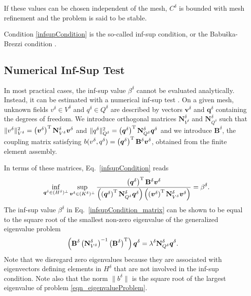 \documentclass[journal]{IEEEtran}
\renewcommand{\vec}[1]{\boldsymbol{#1}} %
\newcommand{\mat}[1]{\mathbf{#1}} %
\newcommand{\paren}[1]{\left(#1\right)}
\newcommand{\transpose}{^{\text T}}
\begin{document}
If these values can be chosen independent of the mesh, $C^\delta$ is bounded with mesh refinement and the problem is said to be stable.

Condition \eqref{infsupCondition} is the so-called inf-sup condition, or the Babu{\v{s}}ka-Brezzi condition \cite{babuvska1973finite,brezzi1974existence}.



\subsection{Numerical Inf-Sup Test}

In most practical cases, the inf-sup value $\beta^\delta$ cannot be evaluated analytically. Instead, it can be estimated with a numerical inf-sup test \cite{brezziBook,chapelle1993inf}. On a given mesh, unknown fields $v^\delta \in V^\delta$ and $q^\delta \in Q^\delta$ are described by vectors $\vec v^{\delta}$ and $\vec q^{\delta}$ containing the degrees of freedom. We introduce orthogonal matrices $\mat N^{\delta}_{V^\delta}$ and $\mat N^{\delta}_{Q^\delta}$ such that $\|v^{\delta}\|_{V^{\delta}}^2 = \paren{\vec v^{\delta}}\transpose \mat N^{\delta}_{V^\delta} \vec v^{\delta}$ and $\|q^{\delta}\|_{Q^{\delta}}^2 = \paren{\vec q^{\delta}}\transpose \mat N^{\delta}_{Q^{\delta}}\vec q^{\delta}$ and we introduce $\mat B^{\delta}$, the coupling matrix satisfying $b(v^{\delta},q^{\delta}) = \paren{\vec q^{\delta}}\transpose \mat B^{\delta} \vec v^{\delta}$, obtained from the finite element assembly.

In terms of these matrices, Eq.~\eqref{infsupCondition} reads
\begin{align}\label{infsupCondition_matrix}
\inf_{\vec q^{\delta}\in (H^\delta)^\perp} \sup_{\vec v^{\delta}\in (K^\delta)^\perp} \frac{\paren{\vec q^{\delta}}\transpose \mat B^{\delta} \vec v^{\delta}}{ \paren{\paren{\vec q^{\delta}}\transpose \mat N^{\delta}_{Q^{\delta}}\vec q^{\delta}} \paren{\paren{\vec v^{\delta}}\transpose \mat N^{\delta}_{V^\delta} \vec v^{\delta}}} = \beta^\delta.
\end{align}
The inf-sup value $\beta^{\delta}$ in Eq.~\eqref{infsupCondition_matrix} can be shown to be equal to the square root of the smallest non-zero eigenvalue of the generalized eigenvalue problem \cite{malkus1981eigenproblems}
\begin{align}\label{eqn_eigenvalueProblem}
\paren{\mat B^{\delta} \paren{\mat N^{\delta}_{V^{\delta}}}^{-1} \paren{\mat B^{\delta}}\transpose} \vec q^{\delta} &= \lambda^{\delta} \mat N^{\delta}_{Q^{\delta}} \vec q^{\delta}.
\end{align}
Note that we disregard zero eigenvalues because they are associated with eigenvectors defining elements in $H^\delta$ that are not involved in the inf-sup condition. Note also that the norm $\|b^\delta\|$ is the square root of the largest eigenvalue of problem \eqref{eqn_eigenvalueProblem}.
\end{document}
